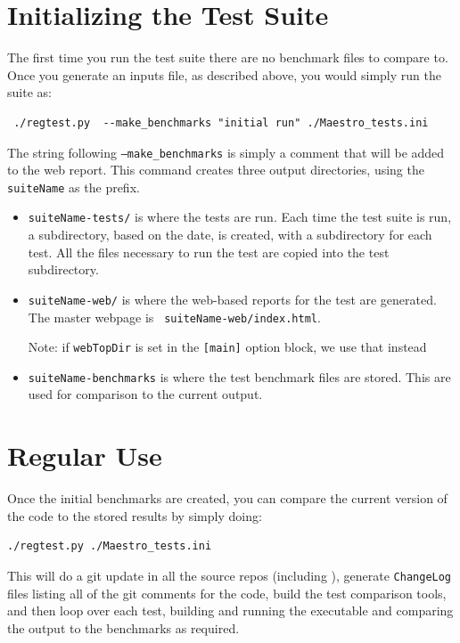 \section{Initializing the Test Suite}

The first time you run the test suite there are no benchmark files to
compare to.  Once you generate an inputs file, as described above, you
would simply run the suite as:
\begin{verbatim}
 ./regtest.py  --make_benchmarks "initial run" ./Maestro_tests.ini
\end{verbatim}
The string following {\tt --make\_benchmarks} is simply a comment that
will be added to the web report.  This command creates three output
directories, using the {\tt suiteName} as the prefix.
\begin{itemize}
\item {\tt suiteName-tests/} is where the tests are run.  Each time the
  test suite is run, a subdirectory, based on the date, is created,
  with a subdirectory for each test.  All the files necessary to run
  the test are copied into the test subdirectory.

\item {\tt suiteName-web/} is where the web-based reports for the test
  are generated.  The master webpage is {\tt
    suiteName-web/index.html}.

  Note: if {\tt webTopDir} is set in the {\tt [main]} option block, we
  use that instead

\item {\tt suiteName-benchmarks} is where the test benchmark files are
  stored.  This are used for comparison to the current output.
\end{itemize}



\section{Regular Use}

Once the initial benchmarks are created, you can compare the current
version of the code to the stored results by simply doing:
\begin{verbatim}
./regtest.py ./Maestro_tests.ini
\end{verbatim}
This will do a git update in all the source repos (including \boxlib),
generate {\tt ChangeLog} files listing all of the git comments for the
code, build the test comparison tools, and then loop over each test,
building and running the executable and comparing the output to the
benchmarks as required.

